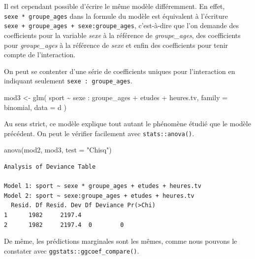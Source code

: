 \documentclass[
  letterpaper,
  DIV=11,
  numbers=noendperiod,
  oneside]{scrreprt}
\newenvironment{Shaded}{\begin{snugshade}}{\end{snugshade}}
\newcommand{\AttributeTok}[1]{\textcolor[rgb]{0.40,0.45,0.13}{#1}}
\newcommand{\FunctionTok}[1]{\textcolor[rgb]{0.28,0.35,0.67}{#1}}
\newcommand{\NormalTok}[1]{\textcolor[rgb]{0.00,0.23,0.31}{#1}}
\newcommand{\OtherTok}[1]{\textcolor[rgb]{0.00,0.23,0.31}{#1}}
\newcommand{\SpecialCharTok}[1]{\textcolor[rgb]{0.37,0.37,0.37}{#1}}
\newcommand{\StringTok}[1]{\textcolor[rgb]{0.13,0.47,0.30}{#1}}
\begin{document}
Il est cependant possible d'écrire le même modèle différemment. En
effet, \texttt{sexe\ *\ groupe\_ages} dans la formule du modèle est
équivalent à l'écriture
\texttt{sexe\ +\ groupe\_ages\ +\ sexe:groupe\_ages}, c'est-à-dire que
l'on demande des coefficients pour la variable \emph{sexe} à la
référence de \emph{groupe\_ages}, des coefficients pour
\emph{groupe\_ages} à la référence de \emph{sexe} et enfin des
coefficients pour tenir compte de l'interaction.

On peut se contenter d'une série de coefficients uniques pour
l'interaction en indiquant seulement \texttt{sexe~:~groupe\_ages}.

\begin{Shaded}
\begin{Highlighting}[]
\NormalTok{mod3 }\OtherTok{\textless{}{-}} \FunctionTok{glm}\NormalTok{(}
\NormalTok{  sport }\SpecialCharTok{\textasciitilde{}}\NormalTok{ sexe }\SpecialCharTok{:}\NormalTok{ groupe\_ages }\SpecialCharTok{+}\NormalTok{ etudes }\SpecialCharTok{+}\NormalTok{ heures.tv,}
  \AttributeTok{family =}\NormalTok{ binomial,}
  \AttributeTok{data =}\NormalTok{ d}
\NormalTok{)}
\end{Highlighting}
\end{Shaded}

Au sens strict, ce modèle explique tout autant le phénomène étudié que
le modèle précédent. On peut le vérifier facilement avec
\texttt{stats::anova()}.

\begin{Shaded}
\begin{Highlighting}[]
\FunctionTok{anova}\NormalTok{(mod2, mod3, }\AttributeTok{test =} \StringTok{"Chisq"}\NormalTok{)}
\end{Highlighting}
\end{Shaded}

\begin{verbatim}
Analysis of Deviance Table

Model 1: sport ~ sexe * groupe_ages + etudes + heures.tv
Model 2: sport ~ sexe:groupe_ages + etudes + heures.tv
  Resid. Df Resid. Dev Df Deviance Pr(>Chi)
1      1982     2197.4                     
2      1982     2197.4  0        0         
\end{verbatim}

De même, les prédictions marginales sont les mêmes, comme nous pouvons
le constater avec \texttt{ggstats::ggcoef\_compare()}.
\end{document}
